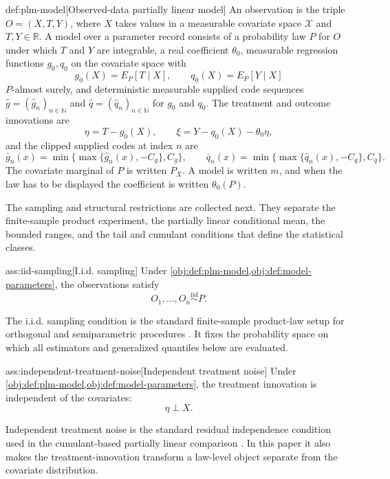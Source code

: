 \documentclass[11pt]{article}
\begin{document}
\begin{definitionv}{def:plm-model}[Observed-data partially linear model]
An observation is the triple \(O=(X,T,Y)\), where \(X\) takes values in a measurable covariate space \(\mathcal X\) and \(T,Y\in\mathbb R\).  A model over a parameter record consists of a probability law \(P\) for \(O\) under which \(T\) and \(Y\) are integrable, a real coefficient \(\theta_0\), measurable regression functions \(g_0,q_0\) on the covariate space with
\[
 g_0(X)=E_P[T\mid X],\qquad q_0(X)=E_P[Y\mid X]
\]
\(P\)-almost surely, and deterministic measurable supplied code sequences \(\widehat g=(\widehat g_n)_{n\in\mathbb N}\) and \(\widehat q=(\widehat q_n)_{n\in\mathbb N}\) for \(g_0\) and \(q_0\).  The treatment and outcome innovations are
\[
 \eta=T-g_0(X),\qquad \xi=Y-q_0(X)-\theta_0\eta,
\]
and the clipped supplied codes at index \(n\) are
\[
 \bar g_n(x)=\min\{\max\{\widehat g_n(x),-C_g\},C_g\},\qquad
 \bar q_n(x)=\min\{\max\{\widehat q_n(x),-C_q\},C_q\}.
\]
The covariate marginal of \(P\) is written \(P_X\).  A model is written \(m\), and when the law has to be displayed the coefficient is written \(\theta_0(P)\).
\end{definitionv}

The sampling and structural restrictions are collected next. They separate the finite-sample product experiment, the partially linear conditional mean, the bounded ranges, and the tail and cumulant conditions that define the statistical classes.

\begin{assumptionv}{ass:iid-sampling}[I.i.d. sampling]
Under \cref{obj:def:plm-model,obj:def:model-parameters}, the observations satisfy
\[
O_1,\ldots,O_n \stackrel{\mathrm{iid}}{\sim} P .
\]
\end{assumptionv}

The i.i.d. sampling condition is the standard finite-sample product-law setup for orthogonal and semiparametric procedures \citep{ChernozhukovEtAl2018DML}. It fixes the probability space on which all estimators and generalized quantiles below are evaluated.

\begin{assumptionv}{ass:independent-treatment-noise}[Independent treatment noise]
Under \cref{obj:def:plm-model,obj:def:model-parameters}, the treatment innovation is independent of the covariates:
\[
\eta \perp X .
\]
\end{assumptionv}

Independent treatment noise is the standard residual independence condition used in the cumulant-based partially linear comparison \citep{JinMackeySyrgkanis2025}. In this paper it also makes the treatment-innovation transform a law-level object separate from the covariate distribution.
\end{document}
